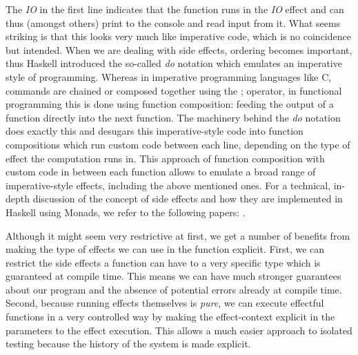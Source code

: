 The \textit{IO} in the first line indicates that the function runs in the \textit{IO} effect and can thus (amongst others) print to the console and read input from it. What seems striking is that this looks very much like imperative code, which is no coincidence but intended. When we are dealing with side effects, ordering becomes important, thus Haskell introduced the so-called \textit{do} notation which emulates an imperative style of programming. Whereas in imperative programming languages like C, commands are chained or composed together using the ; operator, in functional programming this is done using function composition: feeding the output of a function directly into the next function. The machinery behind the \textit{do} notation does exactly this and desugars this imperative-style code into function compositions which run custom code between each line, depending on the type of effect the computation runs in. This approach of function composition with custom code in between each function allows to emulate a broad range of imperative-style effects, including the above mentioned ones. For a technical, in-depth discussion of the concept of side effects and how they are implemented in Haskell using Monads, we refer to the following papers: \cite{jones_tackling_2002,moggi_computational_1989,wadler_essence_1992,wadler_monads_1995,wadler_how_1997}.

\medskip

Although it might seem very restrictive at first, we get a number of benefits from making the type of effects we can use in the function explicit. First, we can restrict the side effects a function can have to a very specific type which is guaranteed at compile time. This means we can have much stronger guarantees about our program and the absence of potential errors already at compile time. Second, because running effects themselves is \textit{pure}, we can execute effectful functions in a very controlled way by making the effect-context explicit in the parameters to the effect execution. This allows a much easier approach to isolated testing because the history of the system is made explicit. 


